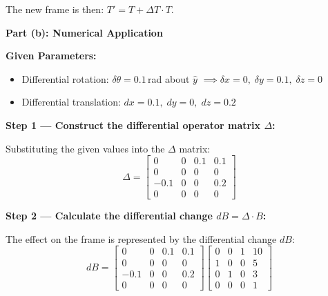 \documentclass[12pt,a3paper]{article}
\begin{document}
\begin{enumerate}
\begin{tcolorbox}[enhanced,breakable,ansbox,colback=cB!4,colframe=cB,
  boxrule=0.8pt,arc=5pt,
  title={\textbf{Answer}},fonttitle=\bfseries\color{white},
  colbacktitle=cB]
The new frame is then: $T' = T + \Delta T \cdot T$.

\medskip
\textbf{Part (b): Numerical Application}

\medskip

\textbf{Given Parameters:}
\begin{itemize}[leftmargin=1.5em, itemsep=2pt]
  \item Differential rotation: $\delta\theta = 0.1$\,rad about $\hat{y}$
    $\implies \delta x=0,\;\delta y=0.1,\;\delta z=0$
  \item Differential translation: $dx=0.1,\;dy=0,\;dz=0.2$
\end{itemize}

\medskip
\textbf{Step 1 — Construct the differential operator matrix $\Delta$:}

Substituting the given values into the $\Delta$ matrix:
\[
  \Delta =
  \begin{bmatrix}
    0 & 0 & 0.1 & 0.1 \\
    0 & 0 & 0 & 0 \\
    -0.1 & 0 & 0 & 0.2 \\
    0 & 0 & 0 & 0
  \end{bmatrix}
\]

\medskip
\textbf{Step 2 — Calculate the differential change $dB = \Delta \cdot B$:}

The effect on the frame is represented by the differential change $dB$:
\[
  dB =
  \begin{bmatrix}
    0 & 0 & 0.1 & 0.1 \\
    0 & 0 & 0 & 0 \\
    -0.1 & 0 & 0 & 0.2 \\
    0 & 0 & 0 & 0
  \end{bmatrix}
  \begin{bmatrix}
    0 & 0 & 1 & 10 \\
    1 & 0 & 0 & 5 \\
    0 & 1 & 0 & 3 \\
    0 & 0 & 0 & 1
  \end{bmatrix}
\]


\end{tcolorbox}
\end{enumerate}
\end{document}
